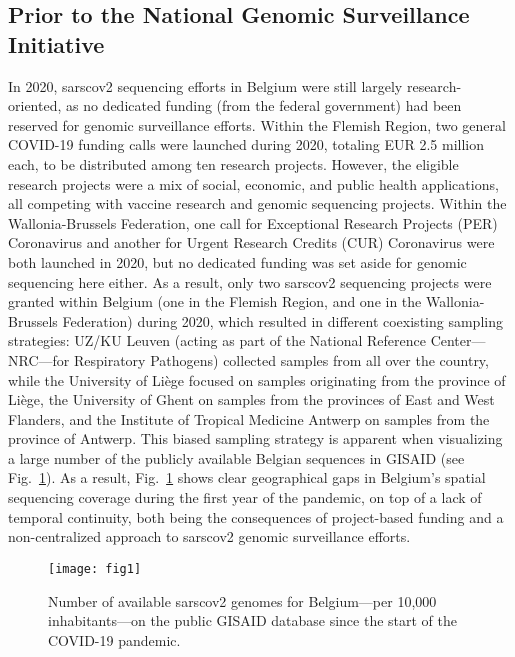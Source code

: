 \subsection{Prior to the National Genomic Surveillance Initiative}
In 2020, \gls{sarscov2} sequencing efforts in Belgium were still largely research-oriented, as no dedicated funding (from the federal government) had been reserved for genomic surveillance efforts.
Within the Flemish Region, two general COVID-19 funding calls were launched during 2020, totaling EUR 2.5 million each, to be distributed among ten research projects.
However, the eligible research projects were a mix of social, economic, and public health applications, all competing with vaccine research and genomic sequencing projects.
Within the Wallonia-Brussels Federation, one call for Exceptional Research Projects (PER) Coronavirus and another for Urgent Research Credits (CUR) Coronavirus were both launched in 2020, but no dedicated funding was set aside for genomic sequencing here either.
As a result, only two \gls{sarscov2} sequencing projects were granted within Belgium (one in the Flemish Region, and one in the Wallonia-Brussels Federation) during 2020, which resulted in different coexisting sampling strategies: UZ/KU Leuven (acting as part of the National Reference Center—NRC—for Respiratory Pathogens) collected samples from all over the country, while the University of Li\`{e}ge focused on samples originating from the province of Li\`{e}ge, the University of Ghent on samples from the provinces of East and West Flanders, and the Institute of Tropical Medicine Antwerp on samples from the province of Antwerp.
This biased sampling strategy is apparent when visualizing a large number of the publicly available Belgian sequences in GISAID (see Fig.~\ref{fig:beGenomesPer10k}).
As a result, Fig.~\ref{fig:beGenomesPer10k} shows clear geographical gaps in Belgium's spatial sequencing coverage during the first year of the pandemic, on top of a lack of temporal continuity, both being the consequences of project-based funding and a non-centralized approach to \gls{sarscov2} genomic surveillance efforts.

\begin{figure}[ht]
  \centering
  \texttt{[image: fig1]}
  \caption[Total SARS-CoV-2 genomes in Belgium]{Number of available \gls{sarscov2} genomes for Belgium---per 10,000 inhabitants---on the public GISAID database since the start of the COVID-19 pandemic.}
  \label{fig:beGenomesPer10k}
\end{figure}

